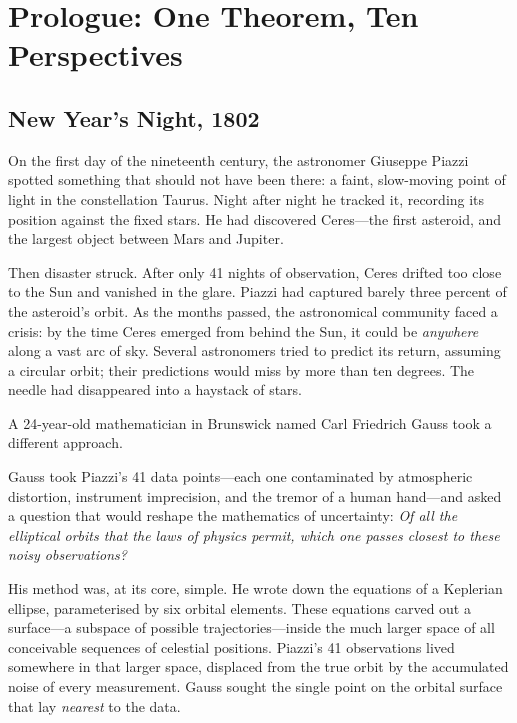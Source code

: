 \section{Prologue: One Theorem, Ten Perspectives}

\subsection*{New Year's Night, 1802}

On the first day of the nineteenth century, the astronomer Giuseppe Piazzi
spotted something that should not have been there: a faint, slow-moving
point of light in the constellation Taurus.  Night after night he tracked
it, recording its position against the fixed stars.  He had discovered
Ceres---the first asteroid, and the largest object between Mars and
Jupiter.

Then disaster struck.  After only 41 nights of observation, Ceres
drifted too close to the Sun and vanished in the glare.
Piazzi had captured barely three percent of the asteroid's orbit.  As the
months passed, the astronomical community faced a crisis: by the
time Ceres emerged from behind the Sun, it could be \emph{anywhere} along
a vast arc of sky.  Several astronomers tried to predict its return,
assuming a circular orbit; their predictions would miss by more than ten
degrees.  The needle had disappeared into a haystack of stars.

A 24-year-old mathematician in Brunswick named Carl Friedrich Gauss
took a different approach.

Gauss took Piazzi's 41 data points---each one contaminated by
atmospheric distortion, instrument imprecision, and the tremor of a
human hand---and asked a question that would reshape the mathematics of
uncertainty: \emph{Of all the elliptical orbits that the laws of physics
permit, which one passes closest to these noisy observations?}

His method was, at its core, simple.  He wrote down the
equations of a Keplerian ellipse, parameterised by six orbital elements.
These equations carved out a surface---a subspace of possible
trajectories---inside the much larger space of all conceivable sequences
of celestial positions.  Piazzi's 41 observations lived somewhere in that
larger space, displaced from the true orbit by the accumulated noise of
every measurement.  Gauss sought the single point on the orbital surface
that lay \emph{nearest} to the data.


